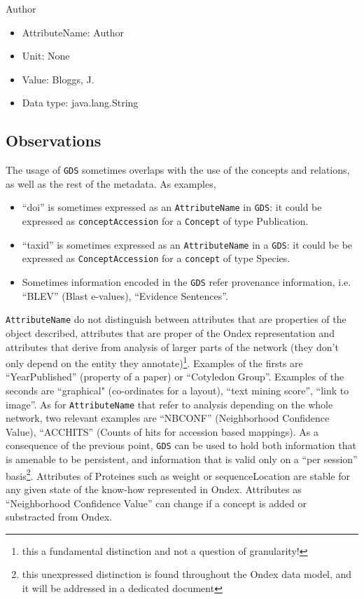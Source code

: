 \documentclass[a4paper,10pt]{article}
\newcommand{\term}[1]{\texttt{#1}\xspace}
\newcommand{\an}{\term{AttributeName}}
\newcommand{\gds}{\term{GDS}}
\begin{document}
Author
\begin{itemize}
\item AttributeName: Author
\item Unit: None
\item Value: Bloggs, J.
\item Data type: java.lang.String
\end{itemize}

\subsection{Observations}
The usage of \gds sometimes overlaps with the use of the concepts and relations, as well as the rest of the metadata.
\vskip 0.5cm
\noindent
As examples,
\begin{itemize}
\item  ``doi'' is sometimes expressed as an \an in \gds : it could be expressed as \term{conceptAccession} for a \term{Concept} of type Publication.
\item ``taxid'' is sometimes expressed as an \an in a \gds : it could be be expressed as \term{ConceptAccession}for a \term{concept} of type Species.
\item Sometimes information encoded in the \gds refer provenance information, i.e. ``BLEV'' (Blast e-values), ``Evidence Sentences''.
\end{itemize}
\noindent
\an do not distinguish between attributes that are properties of the object described, attributes that are proper of the Ondex representation and attributes that derive from analysis of larger parts of the network (they don't only depend on the entity they annotate)\footnote{this a fundamental distinction and not a question of granularity!}. Examples of the firsts are ``YearPublished'' (property of a paper) or ``Cotyledon Group''. Examples of the seconds are  ``graphical" (co-ordinates for a layout), ``text mining score'', ``link to image''. As for \an that refer to analysis depending on the whole network, two relevant examples are ``NBCONF'' (Neighborhood Confidence Value), ``ACCHITS'' (Counts of hits for accession based mappings).
\vskip 0.5cm
\noindent
As a consequence of the previous point, \gds can be used to hold both information that is amenable to be persistent, and information that is valid only on a ``per session'' basis\footnote{this unexpressed distinction is found throughout the Ondex data model, and it will be addressed in a dedicated document}. Attributes of Proteines such as weight or sequenceLocation are stable for any given state of the know-how represented in Ondex. Attributes as ``Neighborhood Confidence Value'' can change if a concept is added or substracted from Ondex.
\end{document}
